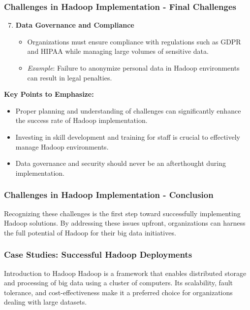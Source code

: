 \documentclass[aspectratio=169]{beamer}
\begin{document}
\begin{frame}[fragile]
    \frametitle{Challenges in Hadoop Implementation - Final Challenges}
    \begin{enumerate}
        \setcounter{enumi}{6}
        \item \textbf{Data Governance and Compliance}
        \begin{itemize}
            \item Organizations must ensure compliance with regulations such as GDPR and HIPAA while managing large volumes of sensitive data.
            \item \textit{Example}: Failure to anonymize personal data in Hadoop environments can result in legal penalties.
        \end{itemize}
    \end{enumerate}

    \textbf{Key Points to Emphasize:}
    \begin{itemize}
        \item Proper planning and understanding of challenges can significantly enhance the success rate of Hadoop implementation.
        \item Investing in skill development and training for staff is crucial to effectively manage Hadoop environments.
        \item Data governance and security should never be an afterthought during implementation.
    \end{itemize}
\end{frame}

\begin{frame}[fragile]
    \frametitle{Challenges in Hadoop Implementation - Conclusion}
    Recognizing these challenges is the first step toward successfully implementing Hadoop solutions. 
    By addressing these issues upfront, organizations can harness the full potential of Hadoop for their big data initiatives.
\end{frame}

\begin{frame}[fragile]
  \frametitle{Case Studies: Successful Hadoop Deployments}
  \begin{block}{Introduction to Hadoop}
    Hadoop is a framework that enables distributed storage and processing of big data using a cluster of computers. Its scalability, fault tolerance, and cost-effectiveness make it a preferred choice for organizations dealing with large datasets.
  \end{block}
\end{frame}
\end{document}
